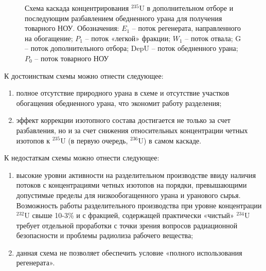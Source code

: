 \begin{figure}[ht]
  \caption{Схема каскада концентрирования $^{235}$U в дополнительном отборе и последующим разбавлением обедненного урана для получения товарного НОУ. Обозначения: $E_1$ – поток регенерата, направленного на обогащение; $P_1$ – поток «легкой» фракции; $W_1$ – поток отвала; G – поток дополнительного отбора; DepU – поток обедненного урана; $P_0$ – поток товарного НОУ
  }\label{fig:enl}
\end{figure}


К достоинствам схемы можно отнести следующее:

\begin{enumerate}
  \item полное отсутствие природного урана в схеме и отсутствие участков обогащения обедненного урана, что экономит работу разделения;
  \item эффект коррекции изотопного состава достигается не только за счет разбавления, но и за счет снижения относительных концентрации четных изотопов к $^{235}$U (в первую очередь, $^{236}$U) в самом каскаде.
\end{enumerate}

К недостаткам схемы можно отнести следующее:
\begin{enumerate}
  \item высокие уровни активности на разделительном производстве ввиду наличия потоков с концентрациями четных изотопов на порядки, превышающими допустимые пределы для низкообогащенного урана и уранового сырья. Возможность работы разделительного производства при уровне концентрации $^{232}$U свыше 10-3\% и с фракцией, содержащей практически «чистый» $^{234}$U требует отдельной проработки с точки зрения вопросов радиационной безопасности и проблемы радиолиза рабочего вещества; 
  \item данная схема не позволяет обеспечить условие «полного использования регенерата».
\end{enumerate}


